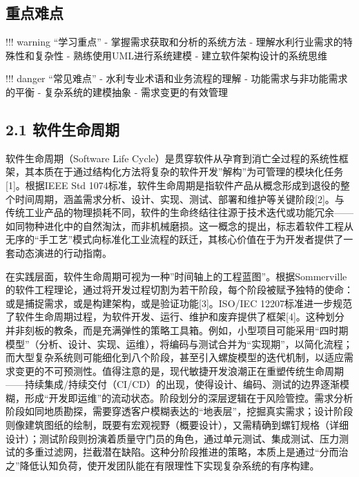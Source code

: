 
\hypertarget{ux91cdux70b9ux96beux70b9}{%
\subsection{重点难点}\label{ux91cdux70b9ux96beux70b9}}

!!! warning ``学习重点'' - 掌握需求获取和分析的系统方法 - 理解水利行业需求的特殊性和复杂性 - 熟练使用UML进行系统建模 - 建立软件架构设计的系统思维

!!! danger ``常见难点'' - 水利专业术语和业务流程的理解 - 功能需求与非功能需求的平衡 - 复杂系统的建模抽象 - 需求变更的有效管理

\hypertarget{ux8f6fux4ef6ux751fux547dux5468ux671f}{%
\subsection{2.1 软件生命周期}\label{ux8f6fux4ef6ux751fux547dux5468ux671f}}

软件生命周期（Software Life Cycle）是贯穿软件从孕育到消亡全过程的系统性框架，其本质在于通过结构化方法将复杂的软件开发''解构''为可管理的模块化任务{[}1{]}。根据IEEE Std 1074标准，软件生命周期是指软件产品从概念形成到退役的整个时间周期，涵盖需求分析、设计、实现、测试、部署和维护等关键阶段{[}2{]}。与传统工业产品的物理损耗不同，软件的生命终结往往源于技术迭代或功能冗余------如同物种进化中的自然淘汰，而非机械磨损。这一概念的提出，标志着软件工程从无序的``手工艺''模式向标准化工业流程的跃迁，其核心价值在于为开发者提供了一套动态演进的行动指南。

在实践层面，软件生命周期可视为一种''时间轴上的工程蓝图''。根据Sommerville的软件工程理论，通过将开发过程切割为若干阶段，每个阶段被赋予独特的使命：或是捕捉需求，或是构建架构，或是验证功能{[}3{]}。ISO/IEC 12207标准进一步规范了软件生命周期过程，为软件开发、运行、维护和废弃提供了框架{[}4{]}。这种划分并非刻板的教条，而是充满弹性的策略工具箱。例如，小型项目可能采用``四时期模型''（分析、设计、实现、运维），将编码与测试合并为``实现期''，以简化流程；而大型复杂系统则可能细化到八个阶段，甚至引入螺旋模型的迭代机制，以适应需求变更的不可预测性。值得注意的是，现代敏捷开发浪潮正在重塑传统生命周期------持续集成/持续交付（CI/CD）的出现，使得设计、编码、测试的边界逐渐模糊，形成``开发即运维''的流动状态。阶段划分的深层逻辑在于风险管控。需求分析阶段如同地质勘探，需要穿透客户模糊表达的``地表层''，挖掘真实需求；设计阶段则像建筑图纸的绘制，既要有宏观视野（概要设计），又需精确到螺钉规格（详细设计）；测试阶段则扮演着质量守门员的角色，通过单元测试、集成测试、压力测试的多重过滤网，拦截潜在缺陷。这种分阶段推进的策略，本质上是通过``分而治之''降低认知负荷，使开发团队能在有限理性下实现复杂系统的有序构建。

